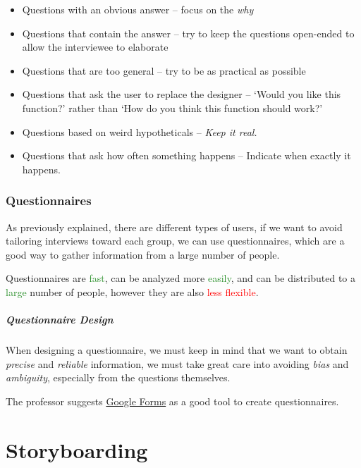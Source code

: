 \documentclass[openright, twoside, twocolumn]{report}
\begin{document}
    \begin{itemize}
      \item Questions with an obvious answer -- focus on the \emph{why}
      \item Questions that contain the answer -- try to keep the questions open-ended to allow the interviewee to elaborate
      \item Questions that are too general -- try to be as practical as possible
      \item Questions that ask the user to replace the designer -- `Would you like this function?' rather than `How do you think this function should work?'
      \item Questions based on weird hypotheticals -- \emph{Keep it real.}
      \item Questions that ask how often something happens -- Indicate when exactly it happens.
    \end{itemize}

    \subsection{Questionnaires}
    As previously explained, there are different types of users, if we want to avoid tailoring interviews toward each group, we can use questionnaires, which are a good way to gather information from a large number of people.

    Questionnaires are \textcolor{ForestGreen}{fast}, can be analyzed more \textcolor{ForestGreen}{easily}, and can be distributed to a \textcolor{ForestGreen}{large} number of people, however they are also \textcolor{Red}{less flexible}.

    \paragraph{Questionnaire Design}
    When designing a questionnaire, we must keep in mind that we want to obtain \emph{precise} and \emph{reliable} information, we must take great care into avoiding \emph{bias} and \emph{ambiguity}, especially from the questions themselves.

    The professor suggests \href{https://www.google.it/intl/it/forms/about/}{Google Forms} as a good tool to create questionnaires.


    \chapter{Storyboarding}
\end{document}
